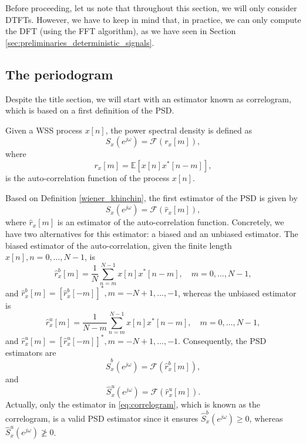 Before proceeding, let us note that throughout this section, we will only consider DTFTs. However, we have to keep in mind that, in practice, we can only compute the DFT (using the FFT algorithm), as we have seen in Section \ref{sec:preliminaries_deterministic_signals}.

\subsection{The periodogram}

Despite the title section, we will start with an estimator known as correlogram, which is based on a first definition of the PSD.
\begin{definition}
	\label{wiener_khinchin}
	Given a WSS process $x[n]$, the power spectral density is defined as
	\begin{equation*}
	S_x(e^{j \omega}) = \mathcal{F}(r_{x}[m]),
	\end{equation*}
	where
	\begin{equation*}
	r_{x}[m] = \mathbb{E}[x[n] x^{\ast}[n-m]],
	\end{equation*}
	is the auto-correlation function of the process $x[n]$.
\end{definition}

Based on Definition \ref{wiener_khinchin}, the first estimator of the PSD is given by
\begin{equation*}
	\hat{S}_x(e^{j \omega}) = \mathcal{F}(\hat{r}_{x}[m]),
\end{equation*}
where $\hat{r}_{x}[m]$ is an estimator of the auto-correlation function. Concretely, we have two alternatives for this estimator: a biased and an unbiased estimator. The biased estimator of the auto-correlation, given the finite length $x[n], n = 0, \ldots, N-1$, is
\begin{equation}
	\label{eq:autocorrelation_biased}
	\hat{r}_{x}^{b}[m] = \frac{1}{N} \sum_{n = m}^{N-1} x[n] x^{\ast}[n-m], \quad m = 0, \ldots, N-1,
\end{equation}
and $\hat{r}_{x}^{b}[m] = \left[ \hat{r}_{x}^{b}[-m] \right]^{\ast}, m = -N+1, \ldots, -1$, whereas the unbiased estimator is
\begin{equation}
	\label{eq:autocorrelation_unbiased}
\hat{r}_{x}^{u}[m] = \frac{1}{N-m} \sum_{n = m}^{N-1} x[n] x^{\ast}[n-m], \quad m = 0, \ldots, N-1,
\end{equation}
and $\hat{r}_{x}^{u}[m] = \left[ \hat{r}_{x}^{u}[-m] \right]^{\ast}, m = -N+1, \ldots, -1$. Consequently, the PSD estimators are
\begin{equation}
\label{eq:correlogram}
\hat{S}_x^{b}(e^{j \omega}) = \mathcal{F}(\hat{r}_{x}^{b}[m]),
\end{equation}
and
\begin{equation*}
\hat{S}_x^{u}(e^{j \omega}) = \mathcal{F}(\hat{r}_{x}^{u}[m]).
\end{equation*}
Actually, only the estimator in \eqref{eq:correlogram}, which is known as the correlogram, is a valid PSD estimator since it ensures $\hat{S}_x^{b}(e^{j \omega}) \geq 0$, whereas $\hat{S}_x^{u}(e^{j \omega}) \not \geq 0$.

